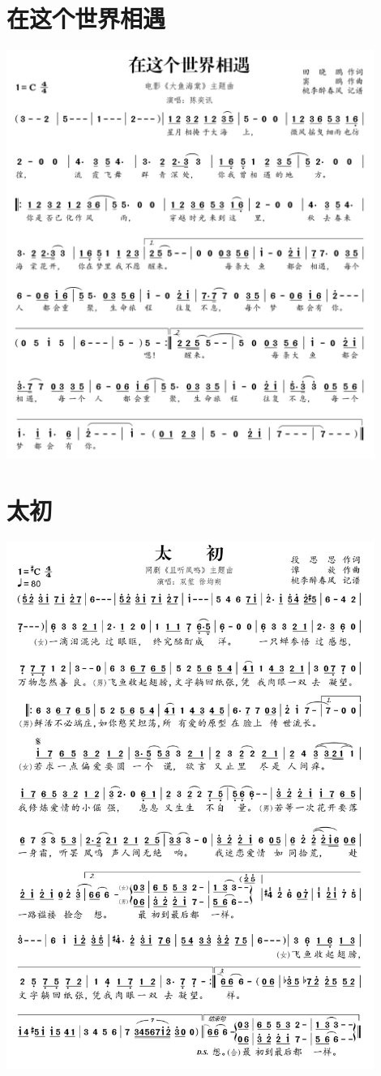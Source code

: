 \documentclass[cn,pad,twocol]{elegantbook}
\begin{document}
\section{在这个世界相遇} \includegraphics[width=0.9\textwidth]{rpi400/20210212在这个世界相遇.png}
\section{太初} \includegraphics[width=0.9\textwidth]{rpi400/20210212太初.png}
\end{document}
